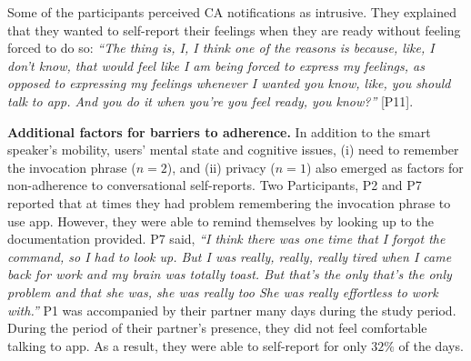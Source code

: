         Some of the participants perceived \ac{CA} notifications as intrusive. 
        They explained that they %
        wanted to self-report their feelings when they are ready without feeling forced to do so:
                \textit{``The thing is, I, I think one of the reasons is because, like, I don't know, that would feel like I am being forced to express my feelings, as opposed to expressing my feelings whenever I wanted you know, like, you should talk to \acl{app}. And you do it when you're you feel ready, you know?''}
                [P11].

         
        \textbf{Additional factors for barriers to adherence. } 
        In addition to the smart speaker's mobility, users' mental state and cognitive issues, (i) need to remember the invocation phrase ($n=2$), and (ii) privacy ($n=1$) also emerged as factors for non-adherence to conversational self-reports. 
        Two Participants, P2 and P7 reported that at times they had problem remembering the invocation phrase to use \acl{app}. However, they were able to remind themselves by looking up to the documentation provided. P7 said,
            \textit{``I think there was one time that I forgot the command, so I had to look up.
            But I was really, really, really tired when I came back for work and my brain was totally toast. But that's the only that's the only problem and that she was, she was really too She was really effortless to work with.''}
        P1 was accompanied by their partner many days during the study period. During the period of their partner's presence, they did not feel comfortable talking to \acl{app}. As a result, they were able to self-report for only $32\%$ of the days.
        

        
        

